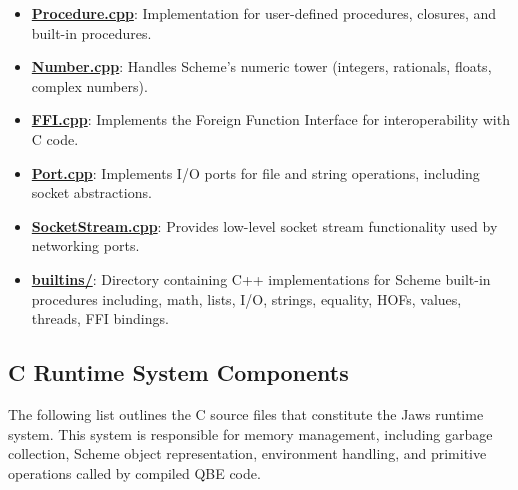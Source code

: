 \documentclass[final]{cmpreport_02}
\begin{document}
\begin{itemize}
    \item \textbf{\href{https://github.com/jamie-wales/Jaws/blob/main/src/interpreter/Procedure.cpp}{Procedure.cpp}}: Implementation for user-defined procedures, closures, and built-in procedures.
    \item \textbf{\href{https://github.com/jamie-wales/Jaws/blob/main/src/interpreter/Number.cpp}{Number.cpp}}: Handles Scheme's numeric tower (integers, rationals, floats, complex numbers).
    \item \textbf{\href{https://github.com/jamie-wales/Jaws/blob/main/src/interpreter/FFI.cpp}{FFI.cpp}}: Implements the Foreign Function Interface for interoperability with C code.
    \item \textbf{\href{https://github.com/jamie-wales/Jaws/blob/main/src/interpreter/Port.cpp}{Port.cpp}}: Implements I/O ports for file and string operations, including socket abstractions.
    \item \textbf{\href{https://github.com/jamie-wales/Jaws/blob/main/src/interpreter/SocketStream.cpp}{SocketStream.cpp}}: Provides low-level socket stream functionality used by networking ports.
    \item \textbf{\href{https://github.com/jamie-wales/Jaws/blob/main/src/interpreter/builtins/}{builtins/}}: Directory containing C++ implementations for Scheme built-in procedures including, math, lists, I/O, strings, equality, HOFs, values, threads, FFI bindings.
\end{itemize}
\subsection{C Runtime System Components}
The following list outlines the C source files that constitute the Jaws runtime system. This system is responsible for memory management, including garbage collection, Scheme object representation, environment handling, and primitive operations called by compiled QBE code. 
\end{document}
